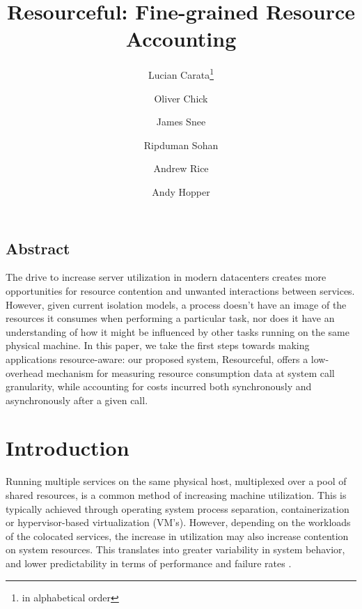 \documentclass[letterpaper,twocolumn,10pt]{article}
\newcommand{\pname}{Resourceful}
\newcommand*\aorder[1][\value{footnote}]{\footnotemark[#1]}
\begin{document}
\date{}

\title{\Large \bf \pname: Fine-grained Resource Accounting}

\author{Lucian Carata\thanks{in alphabetical order}\aorder} \author{Oliver
Chick\aorder} \author{James Snee\aorder} \author{\authorcr{}Ripduman Sohan}
\author{Andrew Rice} \author{Andy Hopper} 

\maketitle

\thispagestyle{empty}


\subsection*{Abstract}
The drive to increase server utilization in modern datacenters creates more
opportunities for resource contention and unwanted interactions between
services. However, given current isolation models, a process doesn't have an
image of the resources it consumes when performing a particular task, nor does
it have an understanding of how it might be influenced by other tasks running on
the same physical machine. In this paper, we take the first steps towards making
applications resource-aware: our proposed system, \pname, offers a low-overhead
mechanism for measuring resource consumption data at system call granularity,
while accounting for costs incurred both synchronously and asynchronously after
a given call.

\section{Introduction} 
Running multiple services on the same physical host, multiplexed over a pool of
shared resources, is a common method of increasing machine utilization. This is
typically achieved through operating system process separation, containerization
or hypervisor-based virtualization (VM's). However, depending on the workloads
of the colocated services, the increase in utilization may also increase
contention on system resources. This translates into greater variability in
system behavior, and lower predictability in terms of performance and failure
rates \cite{dean2013}.
\end{document}
